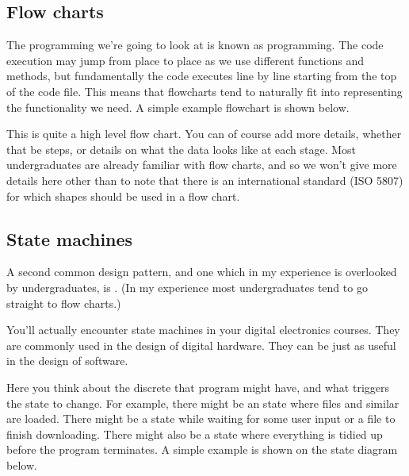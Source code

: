 \documentclass[letterpaper,10pt,british]{sphinxmanual}
\let\sphinxpxdimen\pdfpxdimen\else\newdimen\sphinxpxdimen
\begin{document}
\subsection{Flow charts}
\label{\detokenize{chapters/programming_fundamentals/design_patterns:flow-charts}}
\sphinxAtStartPar
The programming we’re going to look at is known as  programming. The code execution may jump from place to place as we use different functions and methods, but fundamentally the code executes line by line starting from the top of the code file. This means that flowcharts tend to naturally fit into representing the functionality we need. A simple example flowchart is shown below.

\begin{figure}[htbp]
\centering

\noindent\sphinxincludegraphics[width=400\sphinxpxdimen]{{flow_chart}.png}
\end{figure}

\sphinxAtStartPar
This is quite a high level flow chart. You can of course add more details, whether that be steps, or details on what the data looks like at each stage. Most undergraduates are already familiar with flow charts, and so we won’t give more details here other than to note that there is an international standard (ISO 5807) for which shapes should be used in a flow chart.


\subsection{State machines}
\label{\detokenize{chapters/programming_fundamentals/design_patterns:state-machines}}
\sphinxAtStartPar
A second common design pattern, and one which in my experience is overlooked by undergraduates, is . (In my experience most undergraduates tend to go straight to flow charts.)

\sphinxAtStartPar
You’ll actually encounter state machines in your digital electronics courses. They are commonly used in the design of digital hardware. They can be just as useful in the design of software.

\sphinxAtStartPar
Here you think about the discrete  that program might have, and what triggers the state to change. For example, there might be an  state where files and similar are loaded. There might be a  state while waiting for some user input or a file to finish downloading. There might also be a  state where everything is tidied up before the program terminates. A simple example is shown on the state diagram below.
\end{document}
